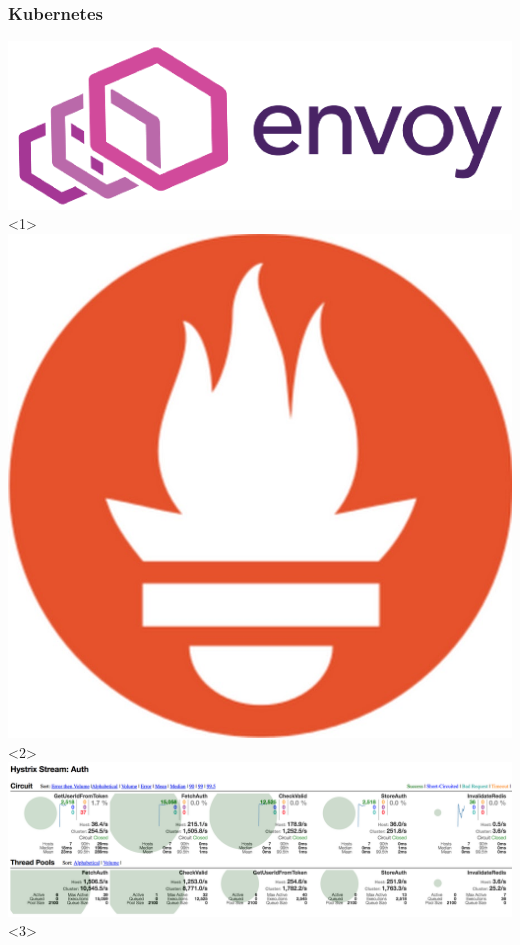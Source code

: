 \documentclass[12pt]{beamer}
\begin{document}
    \begin{frame}
        \frametitle{Kubernetes}
            \begin{center}
                \includegraphics[height=0.4\textheight]{images/envoy-logo.png}<1>
                \includegraphics[height=0.4\textheight]{images/prometheus.jpg}<2>
                \includegraphics[height=0.4\textheight]{images/hystrix.png}<3>

\end{center}
\end{frame}
\end{document}
